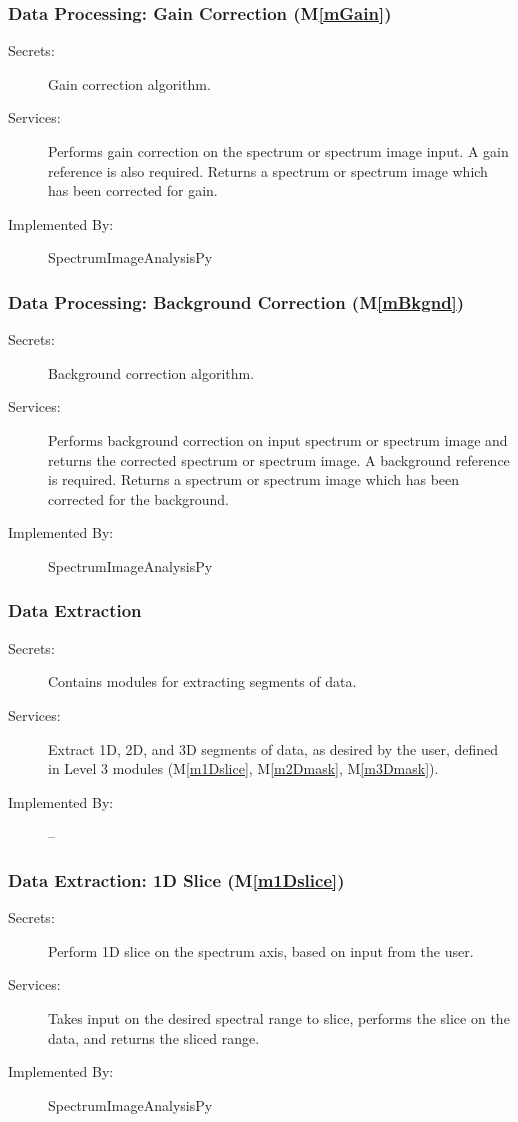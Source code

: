 \documentclass[12pt, titlepage]{article}
\newcommand{\mref}[1]{M\ref{#1}}
\newcommand{\progname}{SpectrumImageAnalysisPy}
\begin{document}
\subsubsection{Data Processing: Gain Correction (\mref{mGain})}
\begin{description}
	\item[Secrets:]Gain correction algorithm.
	\item[Services:]Performs gain correction on the spectrum or spectrum image
input. A gain reference is also required. Returns a spectrum or spectrum image
which has been corrected for gain.
	\item[Implemented By:] \progname
\end{description}

\subsubsection{Data Processing: Background Correction (\mref{mBkgnd})}
\begin{description}
	\item[Secrets:]Background correction algorithm.
	\item[Services:]Performs background correction on input spectrum or spectrum
image and returns the corrected spectrum or spectrum image. A background
reference is required. Returns a spectrum or spectrum image which has been
corrected for the background.
	\item[Implemented By:] \progname
\end{description}

\subsubsection{Data Extraction}
\begin{description}
	\item[Secrets:]Contains modules for extracting segments of data.
	\item[Services:]Extract 1D, 2D, and 3D segments of data, as desired by the
user, defined in Level 3 modules (\mref{m1Dslice}, \mref{m2Dmask},
\mref{m3Dmask}).
	\item[Implemented By:] --
\end{description}

\subsubsection{Data Extraction: 1D Slice (\mref{m1Dslice})}
\begin{description}
	\item[Secrets:]Perform 1D slice on the spectrum axis, based on input from the
user.
	\item[Services:]Takes input on the desired spectral range to slice, performs
the slice on the data, and returns the sliced range.
	\item[Implemented By:] \progname
\end{description}
\end{document}
